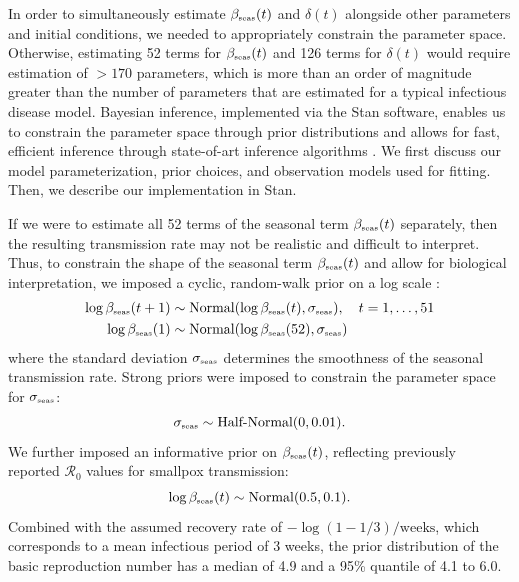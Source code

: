\documentclass[12pt]{article}
\newcommand{\tsub}[2]{#1_{{\textrm{\tiny #2}}}}
\begin{document}
In order to simultaneously estimate $\tsub{\beta}{seas}(t)$ and $\delta(t)$ alongside other parameters and initial conditions, we needed to appropriately constrain the parameter space.
Otherwise, estimating 52 terms for $\tsub{\beta}{seas}(t)$ and 126 terms for $\delta(t)$ would require estimation of $>170$ parameters, which is more than an order of magnitude greater than the number of parameters that are estimated for a typical infectious disease model.
Bayesian inference, implemented via the Stan software, enables us to constrain the parameter space through prior distributions and allows for fast, efficient inference through state-of-art inference algorithms \citep{carpenter2017stan}. 
We first discuss our model parameterization, prior choices, and observation models used for fitting.
Then, we describe our implementation in Stan.

If we were to estimate all 52 terms of the seasonal term $\tsub{\beta}{seas}(t)$ separately, then the resulting transmission rate may not be realistic and difficult to interpret.
Thus, to constrain the shape of the seasonal term $\tsub{\beta}{seas}(t)$ and allow for biological interpretation, we imposed a cyclic, random-walk prior on a log scale \citep{park2025interplay}:
\begin{align}
\log\tsub{\beta}{seas}(t+1) &\sim \mathrm{Normal}(\log\tsub{\beta}{seas}(t), \tsub{\sigma}{seas}), \quad t=1,\dots,51  \\
\log\tsub{\beta}{seas}(1) &\sim \mathrm{Normal}(\log\tsub{\beta}{seas}(52), \tsub{\sigma}{seas})
\end{align}
where the standard deviation $\tsub{\sigma}{seas}$ determines the smoothness of the seasonal transmission rate.
Strong priors were imposed to constrain the parameter space for $\tsub{\sigma}{seas}$:
\begin{equation}
\tsub{\sigma}{seas} \sim \textrm{Half-Normal}(0, 0.01).
\end{equation}
We further imposed an informative prior on $\tsub{\beta}{seas}(t)$, reflecting previously reported $\mathcal R_0$ values for smallpox transmission:
\begin{equation}
\log\tsub{\beta}{seas}(t) \sim \mathrm{Normal}(0.5, 0.1).
\end{equation}
Combined with the assumed recovery rate of $-\log(1-1/3)/\mathrm{weeks}$, which corresponds to a mean infectious period of 3 weeks, the prior distribution of the basic reproduction number has a median of 4.9 and a 95\% quantile of 4.1 to 6.0.
\end{document}
